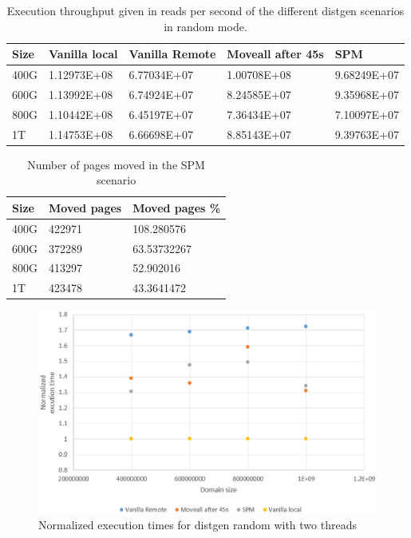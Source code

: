 \begin{table}
	\centering
		\begin{tabularx}{\textwidth}{|l|l|l|l|X|}
		\hline
			Size & Vanilla local & Vanilla Remote & Moveall after 45s & SPM \\
			\hline
			400G & 1.12973E+08 & 6.77034E+07 & 1.00708E+08 & 9.68249E+07\\
			\hline
			600G & 1.13992E+08 & 6.74924E+07 & 8.24585E+07 & 9.35968E+07\\
			\hline
			800G & 1.10442E+08 & 6.45197E+07 & 7.36434E+07 & 7.10097E+07\\
			\hline
			1T & 1.14753E+08 & 6.66698E+07 & 8.85143E+07 & 9.39763E+07\\
			\hline
		\end{tabularx}
		\caption{Execution throughput given in reads per second of the different distgen scenarios in random mode.}
		\label{table:res-tbl-dgentrgrdm2t}
\end{table}

\begin{table}
	\centering
		\begin{tabularx}{\textwidth}{|l|l|l|}
		\hline
			Size & Moved pages & Moved pages \%  \\
			\hline
			400G & 422971 & 108.280576 \\
			\hline
			600G & 372289 & 63.53732267 \\
			\hline
			800G & 413297 & 52.902016 \\
			\hline
			1T & 423478 & 43.3641472 \\
			\hline
		\end{tabularx}
		\caption{Number of pages moved in the SPM scenario}
		\label{table:res-tbl-dgenmvdrdm2t}
\end{table}


\begin{figure}[th]
	\centering
		\includegraphics[width=.8\textwidth]{figures/time-dgentt-random.eps}
		\caption{Normalized execution times for distgen random with two threads}
		\label{fig:res-time-dgentt-ser}
\end{figure}

